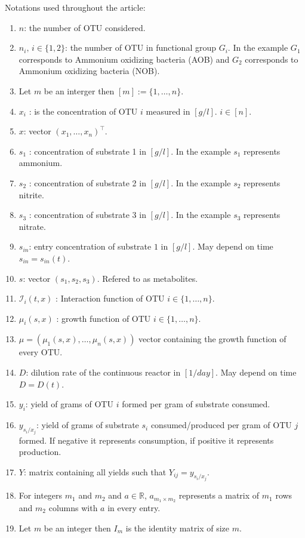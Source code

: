 \documentclass[3p,times]{article}
\newcommand{\R}{\mathbb{R}}
\newcommand{\I}{\mathcal{I}}
\begin{document}
Notations used throughout the article:
\begin{enumerate}
	\item $n$: the number of OTU considered.
	\item $n_i, \, i \in \{1,2\}$: the number of OTU in functional group $G_i$. In the example $G_1$ corresponds to Ammonium oxidizing bacteria (AOB) and $G_2$ corresponds to Ammonium oxidizing bacteria (NOB).
	\item Let $m$ be an interger then $[m]:=\{1,\dots,n \}$. 
	\item $x_i$ :  is the concentration of OTU $i$ measured in $[g/l]$. $i \in [n]$. 
	\item $x$: vector $(x_1,\dots,x_n)^\top$.
	\item $s_1$ : concentration of substrate 1 in $[g/l]$. In the example $s_1$ represents ammonium.
	\item $s_2$ : concentration of substrate 2 in $[g/l]$. In the example $s_2$ represents nitrite. 
	\item $s_3$ : concentration of substrate 3 in $[g/l]$. In the example $s_3$ represents nitrate.
	\item $s_{in}$: entry concentration of substrate $1$ in $[g/l]$. May depend on time $s_{in} = s_{in}(t)$.
	\item $s$:  vector $(s_1,s_2,s_3)$. Refered to as metabolites.
	\item $\I_i(t,x)$ : Interaction function of OTU $i \in \{1,\dots,n\}$.
	\item $\mu_i(s,x)$ : growth function of OTU $i \in \{1,\dots,n\}$.
	\item $\mu = (\mu_1(s,x), \dots, \mu_n(s,x))$ vector containing the growth function of every OTU.
	\item $D$: dilution rate of the continuous reactor in $[1/day]$. May depend on time $D=D(t)$.
	\item $y_{i}$: yield of grams of OTU $i$ formed per gram of substrate consumed. 
	\item $y_{s_i/x_j}$: yield of grams of substrate $s_i$ consumed/produced per gram of OTU $j$ formed. If negative it represents consumption, if positive it represents production.
	\item $Y$: matrix containing all yields such that $Y_{ij} = y_{s_i/x_j}$.
	\item For integers $m_1$ and $m_2$ and $a \in \R$, $a_{m_1 \times m_2}$ represents a matrix of $m_1$ rows and $m_2$ columns with $a$ in every entry. 
	\item Let $m$ be an integer then $I_m$ is the identity matrix of size $m$.

\end{enumerate}
\end{document}

